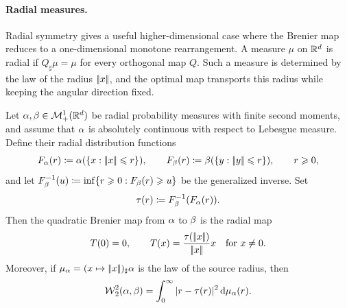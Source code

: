 \paragraph{Radial measures.}

Radial symmetry gives a useful higher-dimensional case where the Brenier map reduces to a one-dimensional monotone rearrangement. A measure $\mu$ on $\mathbb{R}^d$ is radial if $Q_\sharp\mu=\mu$ for every orthogonal map $Q$. Such a measure is determined by the law of the radius $|\!| x |\!|$, and the optimal map transports this radius while keeping the angular direction fixed.

\begin{prop}\label{prop-radial-transport}
	Let $\alpha,\beta\in\mathcal{M}_+^1(\mathbb{R}^d)$ be radial probability measures with finite second moments, and assume that $\alpha$ is absolutely continuous with respect to Lebesgue measure. Define their radial distribution functions
	\[
		F_\alpha(r)\coloneqq \alpha(\{x:|\!| x |\!|\leqslant r\}),
		\qquad
		F_\beta(r)\coloneqq \beta(\{y:|\!| y |\!|\leqslant r\}),
		\qquad r\geqslant0,
	\]
	and let $F_\beta^{-1}(u)\coloneqq\inf\{r\geqslant0:F_\beta(r)\geqslant u\}$ be the generalized inverse. Set
	\[
		\tau(r)\coloneqq F_\beta^{-1}(F_\alpha(r)).
	\]
	Then the quadratic Brenier map from $\alpha$ to $\beta$ is the radial map
	\[
		T(0)=0,
		\qquad
		T(x)=\frac{\tau(|\!| x |\!|)}{|\!| x |\!|}x
		\quad\text{for }x\neq0.
	\]
	Moreover, if $\mu_\alpha=(x\mapsto|\!| x |\!|)_\sharp\alpha$ is the law of the source radius, then
	\[
		\operatorname{\mathcal{W}}_2^2(\alpha,\beta)
		=
		\int_0^\infty |r-\tau(r)|^2\,\mathrm{d}\mu_\alpha(r).
	\]
\end{prop}
